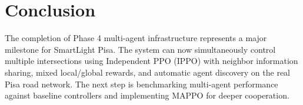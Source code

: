 \documentclass[a4paper,11pt]{article}
\begin{document}
\section{Conclusion}
The completion of Phase 4 multi-agent infrastructure represents a major milestone for SmartLight Pisa. The system can now simultaneously control multiple intersections using Independent PPO (IPPO) with neighbor information sharing, mixed local/global rewards, and automatic agent discovery on the real Pisa road network. The next step is benchmarking multi-agent performance against baseline controllers and implementing MAPPO for deeper cooperation.
\end{document}
